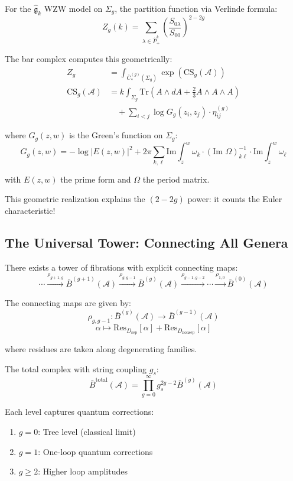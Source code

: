 \begin{example}
For the $\widehat{\mathfrak{g}}_k$ WZW model on $\Sigma_g$, the partition function via Verlinde formula:
$$Z_g(k) = \sum_{\lambda \in \hat{P}_+^k} \left(\frac{S_{0\lambda}}{S_{00}}\right)^{2-2g}$$

The bar complex computes this geometrically:
\begin{align}
Z_g &= \int_{\overline{C}_*^{(g)}(\Sigma_g)} \exp\left(\text{CS}_g(\mathcal{A})\right) \\
\text{CS}_g(\mathcal{A}) &= k \int_{\Sigma_g} \text{Tr}\left(A \wedge dA + \frac{2}{3}A \wedge A \wedge A\right) \\
&\quad + \sum_{i<j} \log G_g(z_i, z_j) \cdot \eta_{ij}^{(g)}
\end{align}

where $G_g(z,w)$ is the Green's function on $\Sigma_g$:
$$G_g(z,w) = -\log|E(z,w)|^2 + 2\pi\sum_{k,\ell} \text{Im}\int_z^w \omega_k \cdot (\text{Im }\Omega)^{-1}_{k\ell} \cdot \text{Im}\int_z^w \omega_\ell$$

with $E(z,w)$ the prime form and $\Omega$ the period matrix.

This geometric realization explains the $(2-2g)$ power: it counts the Euler characteristic!
\end{example}


\subsection{The Universal Tower: Connecting All Genera}\label{subsec:universal-tower}

\begin{theorem}\label{thm:master-tower}
There exists a tower of fibrations with explicit connecting maps:
$$\cdots \xrightarrow{\rho_{g+1,g}} \bar{B}^{(g+1)}(\mathcal{A}) \xrightarrow{\rho_{g,g-1}} \bar{B}^{(g)}(\mathcal{A}) \xrightarrow{\rho_{g-1,g-2}} \cdots \xrightarrow{\rho_{1,0}} \bar{B}^{(0)}(\mathcal{A})$$

The connecting maps are given by:
$$\rho_{g,g-1}: \bar{B}^{(g)}(\mathcal{A}) \to \bar{B}^{(g-1)}(\mathcal{A})$$
$$\alpha \mapsto \text{Res}_{D_{\text{sep}}}[\alpha] + \text{Res}_{D_{\text{nonsep}}}[\alpha]$$

where residues are taken along degenerating families.

The total complex with string coupling $g_s$:
$$\bar{B}^{\text{total}}(\mathcal{A}) = \prod_{g=0}^\infty g_s^{2g-2} \bar{B}^{(g)}(\mathcal{A})$$

Each level captures quantum corrections:
\begin{enumerate}
\item $g=0$: Tree level (classical limit)
\item $g=1$: One-loop quantum corrections
\item $g \geq 2$: Higher loop amplitudes
\end{enumerate}
\end{theorem}

